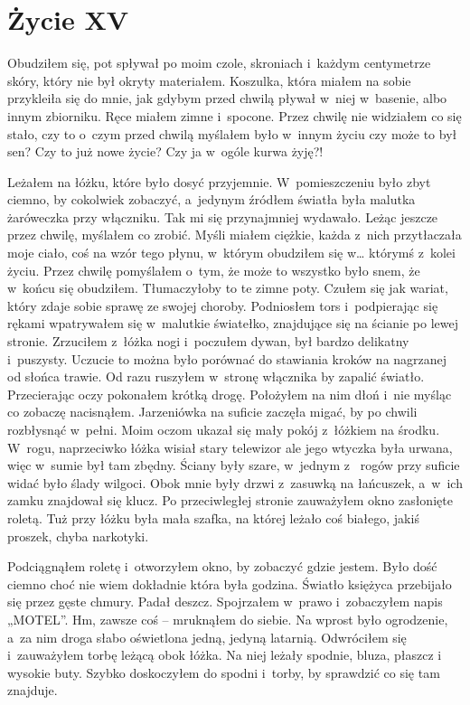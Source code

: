 \chapter{Życie XV}

Obudziłem się, pot spływał po moim czole, skroniach i~każdym centymetrze skóry, który nie był okryty materiałem. 
Koszulka, która miałem na sobie przykleiła się do mnie, jak gdybym przed chwilą pływał w~niej w~basenie, albo innym 
zbiorniku. Ręce miałem zimne i~spocone. Przez chwilę nie widziałem co się stało, czy to o~czym przed chwilą myślałem 
było w~innym życiu czy może to był sen? Czy to już nowe życie? Czy ja w~ogóle kurwa żyję?! 

Leżałem na łóżku, które było dosyć przyjemnie. W~pomieszczeniu było zbyt ciemno, by cokolwiek zobaczyć, a~jedynym 
źródłem światła była malutka żaróweczka przy włączniku. Tak mi się przynajmniej wydawało. Leżąc jeszcze przez chwilę, 
myślałem co zrobić. Myśli miałem ciężkie, każda z~nich przytłaczała moje ciało, coś na wzór tego płynu, w~którym 
obudziłem się w… którymś z~kolei życiu. Przez chwilę pomyślałem o~tym, że może to wszystko było snem, że w~końcu się 
obudziłem. Tłumaczyłoby to te zimne poty. Czułem się jak wariat, który zdaje sobie sprawę ze swojej choroby. 
Podniosłem tors i~podpierając się rękami wpatrywałem się w~malutkie światełko, znajdujące się na ścianie po lewej 
stronie. Zrzuciłem z~łóżka nogi i~poczułem dywan, był bardzo delikatny i~puszysty. Uczucie to można było porównać do 
stawiania kroków na nagrzanej od słońca trawie. Od razu ruszyłem w~stronę włącznika by zapalić światło. Przecierając 
oczy pokonałem krótką drogę. Położyłem na nim dłoń i~nie myśląc co zobaczę nacisnąłem. Jarzeniówka na suficie zaczęła 
migać, by po chwili rozbłysnąć w~pełni. Moim oczom ukazał się mały pokój z~łóżkiem na środku. W~rogu, naprzeciwko 
łóżka wisiał stary telewizor ale jego wtyczka była urwana, więc w~sumie był tam zbędny. Ściany były szare, w~jednym z~
rogów przy suficie widać było ślady wilgoci. Obok mnie były drzwi z~zasuwką na łańcuszek, a~w~ich zamku znajdował się 
klucz. Po przeciwległej stronie zauważyłem okno zasłonięte roletą. Tuż przy łóżku była mała szafka, na której leżało 
coś białego, jakiś proszek, chyba narkotyki. 

Podciągnąłem roletę i~otworzyłem okno, by zobaczyć gdzie jestem. Było dość ciemno choć nie wiem dokładnie która była 
godzina. Światło księżyca przebijało się przez gęste chmury. Padał deszcz. Spojrzałem w~prawo i~zobaczyłem napis 
„MOTEL”. Hm, zawsze coś -- mruknąłem do siebie. Na wprost było ogrodzenie, a~za nim droga słabo oświetlona jedną, 
jedyną latarnią. Odwróciłem się i~zauważyłem torbę leżącą obok łóżka. Na niej leżały spodnie, bluza, płaszcz i~
wysokie buty. Szybko doskoczyłem do spodni i~torby, by sprawdzić co się tam znajduje. 

